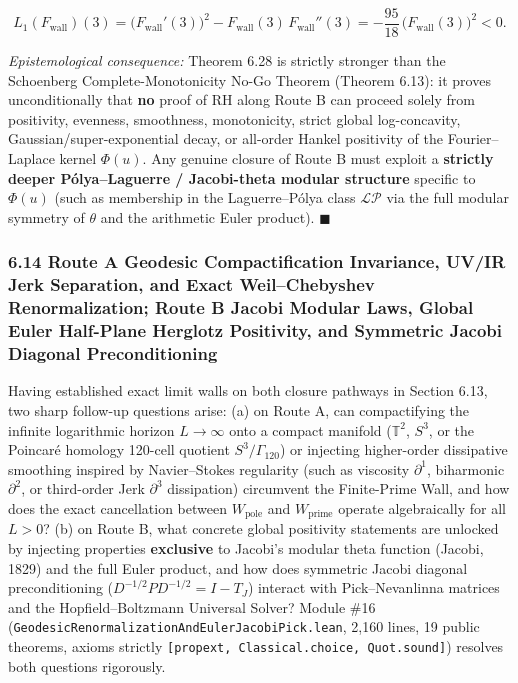 \documentclass[
  11pt,
]{article}
\begin{document}
\begin{enumerate}
\begin{itemize}
    \[L_1(F_{\text{wall}})(3) = \big(F_{\text{wall}}'(3)\big)^2 - F_{\text{wall}}(3)\,F_{\text{wall}}''(3) = -\frac{95}{18}\,\big(F_{\text{wall}}(3)\big)^2 < 0.\]
  \end{itemize}

  \emph{Epistemological consequence:} Theorem 6.28 is strictly stronger
  than the Schoenberg Complete-Monotonicity No-Go Theorem (Theorem
  6.13): it proves unconditionally that \textbf{no} proof of RH along
  Route B can proceed solely from positivity, evenness, smoothness,
  monotonicity, strict global log-concavity, Gaussian/super-exponential
  decay, or all-order Hankel positivity of the Fourier--Laplace kernel
  \(\Phi(u)\). Any genuine closure of Route B must exploit a
  \textbf{strictly deeper Pólya--Laguerre / Jacobi-theta modular
  structure} specific to \(\Phi(u)\) (such as membership in the
  Laguerre--Pólya class \(\mathcal{LP}\) via the full modular symmetry
  of \(\theta\) and the arithmetic Euler product). \(\blacksquare\)
\end{enumerate}

\subsubsection{6.14 Route A Geodesic Compactification Invariance, UV/IR
Jerk Separation, and Exact Weil--Chebyshev Renormalization; Route B
Jacobi Modular Laws, Global Euler Half-Plane Herglotz Positivity, and
Symmetric Jacobi Diagonal
Preconditioning}\label{route-a-geodesic-compactification-invariance-uvir-jerk-separation-and-exact-weilchebyshev-renormalization-route-b-jacobi-modular-laws-global-euler-half-plane-herglotz-positivity-and-symmetric-jacobi-diagonal-preconditioning}

Having established exact limit walls on both closure pathways in Section
6.13, two sharp follow-up questions arise: (a) on Route A, can
compactifying the infinite logarithmic horizon \(L \to \infty\) onto a
compact manifold (\(\mathbb{T}^2\), \(S^3\), or the Poincaré homology
120-cell quotient \(S^3/\Gamma_{120}\)) or injecting higher-order
dissipative smoothing inspired by Navier--Stokes regularity (such as
viscosity \(\partial^1\), biharmonic \(\partial^2\), or third-order Jerk
\(\partial^3\) dissipation) circumvent the Finite-Prime Wall, and how
does the exact cancellation between \(W_{\text{pole}}\) and
\(W_{\text{prime}}\) operate algebraically for all \(L > 0\)? (b) on
Route B, what concrete global positivity statements are unlocked by
injecting properties \textbf{exclusive} to Jacobi's modular theta
function (Jacobi, 1829) and the full Euler product, and how does
symmetric Jacobi diagonal preconditioning
(\(D^{-1/2} P D^{-1/2} = I - T_J\)) interact with Pick--Nevanlinna
matrices and the Hopfield--Boltzmann Universal Solver? Module \#16
(\texttt{GeodesicRenormalizationAndEulerJacobiPick.lean}, 2,160 lines,
19 public theorems, axioms strictly
\texttt{{[}propext,\ Classical.choice,\ Quot.sound{]}}) resolves both
questions rigorously.
\end{document}
